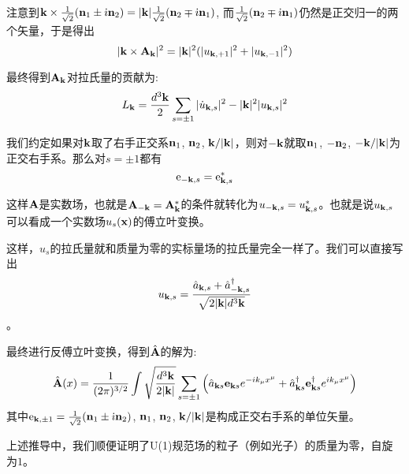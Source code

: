 \documentclass[CJK]{beamer}
\begin{document}
\begin{frame}
\bch
注意到${\mathbf{k}} \times \frac{1}{\sqrt{2}}({\mathbf{n}}_1\pm {\dot{\imath}}{\mathbf{n}}_2) =|{\mathbf{k}}|  \frac{1}{\sqrt{2}}({\mathbf{n}}_2 \mp {\dot{\imath}} {\mathbf{n}}_1)$, 而$ \frac{1}{\sqrt{2}}({\mathbf{n}}_2 \mp {\dot{\imath}} {\mathbf{n}}_1)$仍然是正交归一的两个矢量，于是得出
$$ |{\mathbf{k}} \times {\mathbf{A}}_{\mathbf{k}}|^2 = |{\mathbf{k}}|^2(|u_{{\mathbf{k}},+1}|^2 + |u_{{\mathbf{k}},-1}|^2)$$

最终得到${\mathbf{A}}_{\mathbf{k}}$对拉氏量的贡献为:
$$ L_{\mathbf{k}} = \frac{d^3{\mathbf{k}}}{2}\sum_{s=\pm 1}  |\dot u_{{\mathbf{k}},s}|^2  - |{\mathbf{k}}|^2 |u_{{\mathbf{k}},s}|^2$$

\ech
\end{frame}


\begin{frame}
\bch

我们约定如果对${\mathbf{k}}$取了右手正交系${\mathbf{n}}_1$, ${\mathbf{n}}_2$, ${\mathbf{k}}/|{\mathbf{k}}|$，则对$-{\mathbf{k}}$就取${\mathbf{n}}_1$, $-{\mathbf{n}}_2$, $-{\mathbf{k}}/|{\mathbf{k}}|$为正交右手系。那么对$s=\pm 1$都有
$$\mathrm{e}_{-{\mathbf{k}}, s}  = \mathrm{e}_{{\mathbf{k}}, s}^*$$

这样${\mathbf{A}}$是实数场，也就是${\mathbf{A}}_{-{\mathbf{k}}} = {\mathbf{A}}_{\mathbf{k}}^*$的条件就转化为$u_{-{\mathbf{k}}, s} = u_{{\mathbf{k}}, s}^*$。也就是说$u_{{\mathbf{k}}, s}$ 可以看成一个实数场$u_s({\mathbf{x}})$的傅立叶变换。
\ech
\end{frame}

\begin{frame}
\bch

这样，$u_s$的拉氏量就和质量为零的实标量场的拉氏量完全一样了。我们可以直接写出
$$ u_{{\mathbf{k}},s} = \frac{{\hat{a}}_{{\mathbf{k}},s} + {\hat{a}^\dagger}_{-{\mathbf{k}},s}}{\sqrt{2 |{\mathbf{k}}| d^3{\mathbf{k}}}}$$。

最终进行反傅立叶变换，得到$\hat{{\mathbf{A}}}$的解为:
$$\hat{{\mathbf{A}}}(x) = \frac{1}{(2\pi)^{3/2}} \int \sqrt{\frac{d^3{\mathbf{k}}}{2|{\mathbf{k}}|}} \sum_{s=\pm 1}\left({\hat{a}}_{{\mathbf{k}} s} \mathbf{e}_{{\mathbf{k}} s} e^{-ik_\mu x^\mu} + {\hat{a}^\dagger}_{{\mathbf{k}} s} \mathbf{e}^\dagger_{{\mathbf{k}} s} e^{ik_\mu x^\mu}\right) $$
其中$\mathrm{e}_{{\mathbf{k}},\pm 1} = \frac{1}{\sqrt{2}}({\mathbf{n}}_1 \pm {\dot{\imath}} {\mathbf{n}}_2)$, ${\mathbf{n}}_1$, ${\mathbf{n}}_2$, ${\mathbf{k}}/|{\mathbf{k}}|$是构成正交右手系的单位矢量。 

\ech
\end{frame}

\begin{frame}
\bch
上述推导中，我们顺便证明了U(1)规范场的粒子（例如光子）的质量为零，自旋为$1$。
\ech
\end{frame}
\end{document}
